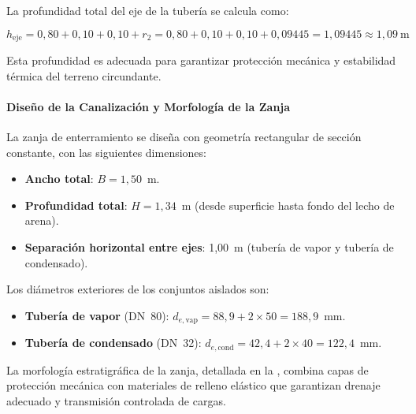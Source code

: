 \documentclass[12pt]{article}
\begin{document}
La profundidad total del eje de la tubería se calcula como:

\begin{equation}
	h_{\text{eje}} = 0{,}80 + 0{,}10 + 0{,}10 + r_2 = 0{,}80 + 0{,}10 + 0{,}10 + 0{,}09445 = 1{,}09445 \approx 1{,}09~\text{m}
	\label{eq:profundidad_eje}
\end{equation}

Esta profundidad es adecuada para garantizar protección mecánica y estabilidad térmica del terreno circundante.

\paragraph{Diseño de la Canalización y Morfología de la Zanja}
\label{par:diseno_canalizacion}

La zanja de enterramiento se diseña con geometría rectangular de sección constante, con las siguientes dimensiones:

\begin{itemize}[noitemsep]
	\item \textbf{Ancho total}: $B = 1{,}50$~m.
	\item \textbf{Profundidad total}: $H = 1{,}34$~m (desde superficie hasta fondo del lecho de arena).
	\item \textbf{Separación horizontal entre ejes}: 1{,}00~m (tubería de vapor y tubería de condensado).
\end{itemize}

Los diámetros exteriores de los conjuntos aislados son:

\begin{itemize}[noitemsep]
	\item \textbf{Tubería de vapor} (DN~80): $d_{e,\text{vap}} = 88{,}9 + 2 \times 50 = 188{,}9$~mm.
	\item \textbf{Tubería de condensado} (DN~32): $d_{e,\text{cond}} = 42{,}4 + 2 \times 40 = 122{,}4$~mm.
\end{itemize}

La morfología estratigráfica de la zanja, detallada en la , combina capas de protección mecánica con materiales de relleno elástico que garantizan drenaje adecuado y transmisión controlada de cargas.
\end{document}

